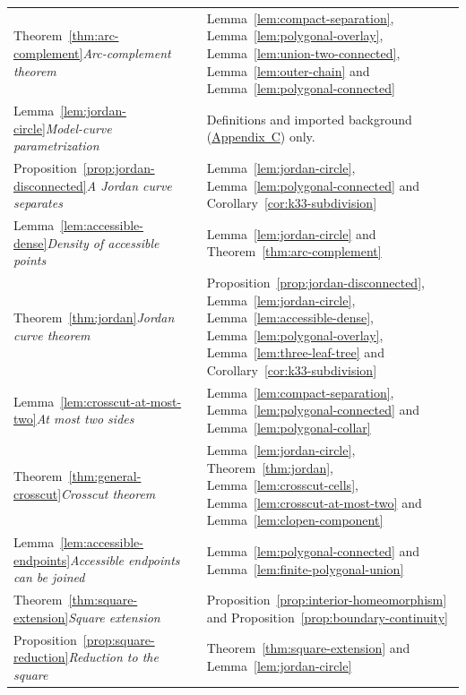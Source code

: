 \documentclass[11pt]{article}
\theoremstyle{mainplain}
\theoremstyle{mainroman}
\theoremstyle{definition}
\numberwithin{equation}{section}
\begin{document}
\begin{longtable}{@{}>{\raggedright\arraybackslash}p{}>{\raggedright\arraybackslash}p{}@{}}
Theorem~\ref{thm:arc-complement}\newline\emph{Arc-complement theorem} & Lemma~\ref{lem:compact-separation}, Lemma~\ref{lem:polygonal-overlay}, Lemma~\ref{lem:union-two-connected}, Lemma~\ref{lem:outer-chain} and Lemma~\ref{lem:polygonal-connected} \\
Lemma~\ref{lem:jordan-circle}\newline\emph{Model-curve parametrization} & Definitions and imported background (\hyperref[app:background]{Appendix~C}) only. \\
Proposition~\ref{prop:jordan-disconnected}\newline\emph{A Jordan curve separates} & Lemma~\ref{lem:jordan-circle}, Lemma~\ref{lem:polygonal-connected} and Corollary~\ref{cor:k33-subdivision} \\
Lemma~\ref{lem:accessible-dense}\newline\emph{Density of accessible points} & Lemma~\ref{lem:jordan-circle} and Theorem~\ref{thm:arc-complement} \\
Theorem~\ref{thm:jordan}\newline\emph{Jordan curve theorem} & Proposition~\ref{prop:jordan-disconnected}, Lemma~\ref{lem:jordan-circle}, Lemma~\ref{lem:accessible-dense}, Lemma~\ref{lem:polygonal-overlay}, Lemma~\ref{lem:three-leaf-tree} and Corollary~\ref{cor:k33-subdivision} \\
Lemma~\ref{lem:crosscut-at-most-two}\newline\emph{At most two sides} & Lemma~\ref{lem:compact-separation}, Lemma~\ref{lem:polygonal-connected} and Lemma~\ref{lem:polygonal-collar} \\
Theorem~\ref{thm:general-crosscut}\newline\emph{Crosscut theorem} & Lemma~\ref{lem:jordan-circle}, Theorem~\ref{thm:jordan}, Lemma~\ref{lem:crosscut-cells}, Lemma~\ref{lem:crosscut-at-most-two} and Lemma~\ref{lem:clopen-component} \\
Lemma~\ref{lem:accessible-endpoints}\newline\emph{Accessible endpoints can be joined} & Lemma~\ref{lem:polygonal-connected} and Lemma~\ref{lem:finite-polygonal-union} \\
Theorem~\ref{thm:square-extension}\newline\emph{Square extension} & Proposition~\ref{prop:interior-homeomorphism} and Proposition~\ref{prop:boundary-continuity} \\
Proposition~\ref{prop:square-reduction}\newline\emph{Reduction to the square} & Theorem~\ref{thm:square-extension} and Lemma~\ref{lem:jordan-circle} \\

\end{longtable}
\end{document}
